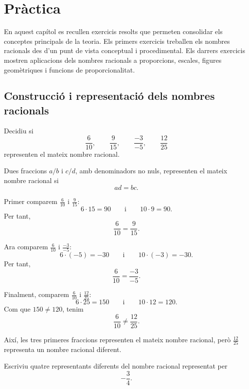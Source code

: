 \chapter{Pràctica}
\label{cap:practica}

En aquest capítol es recullen exercicis resolts que permeten consolidar els conceptes principals de la teoria. Els primers exercicis treballen els nombres racionals des d'un punt de vista conceptual i procedimental. Els darrers exercicis mostren aplicacions dels nombres racionals a proporcions, escales, figures geomètriques i funcions de proporcionalitat.

\section{Construcció i representació dels nombres racionals}

\begin{exercici}
	Decidiu si
	\[
		\frac{6}{10},\qquad \frac{9}{15},\qquad \frac{-3}{-5},\qquad \frac{12}{25}
	\]
	representen el mateix nombre racional.
\end{exercici}

\begin{solucio}
	Dues fraccions \(a/b\) i \(c/d\), amb denominadors no nuls, representen el mateix nombre racional si
	\[
		ad=bc.
	\]

	Primer comparem \(\frac{6}{10}\) i \(\frac{9}{15}\):
	\[
		6\cdot15=90
		\qquad\text{i}\qquad
		10\cdot9=90.
	\]
	Per tant,
	\[
		\frac{6}{10}=\frac{9}{15}.
	\]

	Ara comparem \(\frac{6}{10}\) i \(\frac{-3}{-5}\):
	\[
		6\cdot(-5)=-30
		\qquad\text{i}\qquad
		10\cdot(-3)=-30.
	\]
	Per tant,
	\[
		\frac{6}{10}=\frac{-3}{-5}.
	\]

	Finalment, comparem \(\frac{6}{10}\) i \(\frac{12}{25}\):
	\[
		6\cdot25=150
		\qquad\text{i}\qquad
		10\cdot12=120.
	\]
	Com que \(150\neq120\), tenim
	\[
		\frac{6}{10}\neq\frac{12}{25}.
	\]

	Així, les tres primeres fraccions representen el mateix nombre racional, però \(\frac{12}{25}\) representa un nombre racional diferent.
\end{solucio}

\begin{exercici}
	Escriviu quatre representants diferents del nombre racional representat per
	\[
		-\frac{3}{4}.
	\]
\end{exercici}

